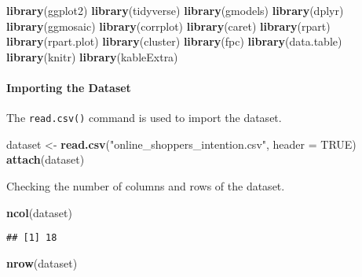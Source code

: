 \documentclass[
]{article}
\newenvironment{Shaded}{\begin{snugshade}}{\end{snugshade}}
\newcommand{\DataTypeTok}[1]{\textcolor[rgb]{0.13,0.29,0.53}{#1}}
\newcommand{\KeywordTok}[1]{\textcolor[rgb]{0.13,0.29,0.53}{\textbf{#1}}}
\newcommand{\NormalTok}[1]{#1}
\newcommand{\OtherTok}[1]{\textcolor[rgb]{0.56,0.35,0.01}{#1}}
\newcommand{\StringTok}[1]{\textcolor[rgb]{0.31,0.60,0.02}{#1}}
\begin{document}
\begin{Shaded}
\begin{Highlighting}[]
\KeywordTok{library}\NormalTok{(ggplot2)}
\KeywordTok{library}\NormalTok{(tidyverse)}
\KeywordTok{library}\NormalTok{(gmodels)}
\KeywordTok{library}\NormalTok{(dplyr)}
\KeywordTok{library}\NormalTok{(ggmosaic)}
\KeywordTok{library}\NormalTok{(corrplot)}
\KeywordTok{library}\NormalTok{(caret)}
\KeywordTok{library}\NormalTok{(rpart)}
\KeywordTok{library}\NormalTok{(rpart.plot)}
\KeywordTok{library}\NormalTok{(cluster)}
\KeywordTok{library}\NormalTok{(fpc)}
\KeywordTok{library}\NormalTok{(data.table)}
\KeywordTok{library}\NormalTok{(knitr)}
\KeywordTok{library}\NormalTok{(kableExtra)}
\end{Highlighting}
\end{Shaded}

\hypertarget{importing-the-dataset}{%
\paragraph{\texorpdfstring{Importing the Dataset\\
}{Importing the Dataset }}\label{importing-the-dataset}}

The \texttt{read.csv()} command is used to import the dataset.

\begin{Shaded}
\begin{Highlighting}[]
\NormalTok{dataset <-}\StringTok{ }\KeywordTok{read.csv}\NormalTok{(}\StringTok{"online_shoppers_intention.csv"}\NormalTok{, }\DataTypeTok{header =} \OtherTok{TRUE}\NormalTok{)}
\KeywordTok{attach}\NormalTok{(dataset)}
\end{Highlighting}
\end{Shaded}

Checking the number of columns and rows of the dataset.

\begin{Shaded}
\begin{Highlighting}[]
\KeywordTok{ncol}\NormalTok{(dataset)}
\end{Highlighting}
\end{Shaded}

\begin{verbatim}
## [1] 18
\end{verbatim}

\begin{Shaded}
\begin{Highlighting}[]
\KeywordTok{nrow}\NormalTok{(dataset)}
\end{Highlighting}
\end{Shaded}
\end{document}
